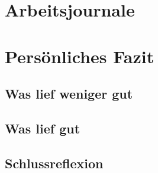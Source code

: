 

\chapter{Arbeitsjournale}













\chapter{Persönliches Fazit}

\section{Was lief weniger gut}

\section{Was lief gut}

\section{Schlussreflexion}